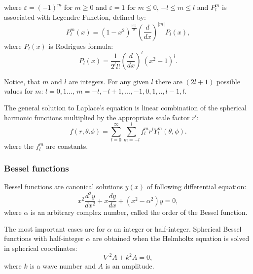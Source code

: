 \documentclass[a4paper, 12pt]{article}
\begin{document}
where $\varepsilon = (-1)^m$ for $m\geq0$ and $\varepsilon=1$ for $m \leq 0$, $-l \leq m \leq l$ and $P_l^m $ is associated with Legendre Function, defined by:
	$$P_l^m(x)=(1-x^2)^{\frac{|m|}{2}}(\frac{d}{dx})^{|m|}P_l(x),$$
where $P_l(x) $ is Rodrigues formula:
	$$P_l(x) = \frac{1}{2^l l!}(\frac{d}{dx})^l (x^2-1)^l.$$


Notice, that $m$ and $l$ are integers. For any given $l$ there are $(2l+1)$ possible values for $m$: $l=0, 1...$, $m = -l, -l+1,..., -1, 0, 1, .., l-1, l.$


The general solution to Laplace's equation is linear combination of the spherical harmonic functions multiplied by the appropriate scale factor $r^l$:
	$$f(r, \theta. \phi) = \sum_{l=0} ^{\infty}\sum_{m=-l} ^{l}f_l^mr^l Y_l^m(\theta, \phi).$$
where the $f_l^m$ are constants.


\subsubsection{Bessel functions}
Bessel functions are canonical solutions $y(x)$ of following differential equation:
\begin{equation}\label{bess_eq}
x^2\frac{d^2 y}{dx^2}+x\frac{dy}{dx}+(x^2-\alpha^2)y = 0,
\end{equation}
where $\alpha$ is an arbitrary complex number, called the order of the Bessel function.

The most important cases are for $\alpha$ an integer or half-integer. Spherical Bessel functions with half-integer $\alpha$ are obtained when the Helmholtz equation is solved in spherical coordinates:
$$\nabla^2 A+k^2 A=0,$$
where $k$  is a wave number and $A$ is an amplitude.
\end{document}
